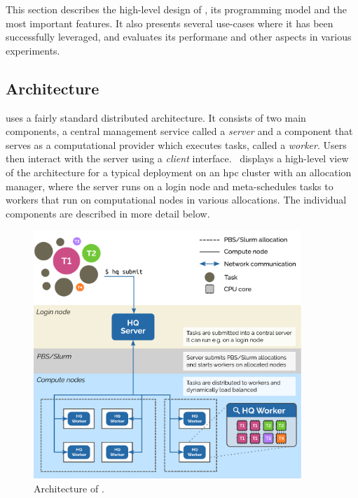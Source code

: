 This section describes the high-level design of \hyperqueue{}, its programming model and
the most important features. It also presents several use-cases where it has been successfully
leveraged, and evaluates its performane and other aspects in various experiments.


\subsection{Architecture}
\label{hq:architecture}
\hyperqueue{} uses a fairly standard distributed architecture. It consists of two main
components, a central management service called a \emph{server} and a component that
serves as a computational provider which executes tasks, called a \emph{worker}. Users
then interact with the server using a \emph{client} interface.~
displays a high-level view of the \hq{} architecture for a typical deployment on
an \gls{hpc} cluster with an allocation manager, where the server runs on a login
node and meta-schedules tasks to workers that run on computational nodes in various allocations.
The individual components are described in more detail below.

\begin{figure}[h]
	\centering
	\includegraphics[width=0.9\textwidth]{imgs/hq/architecture}
	\caption{Architecture of \hyperqueue{}.}
	\label{fig:hq-architecture}
\end{figure}

